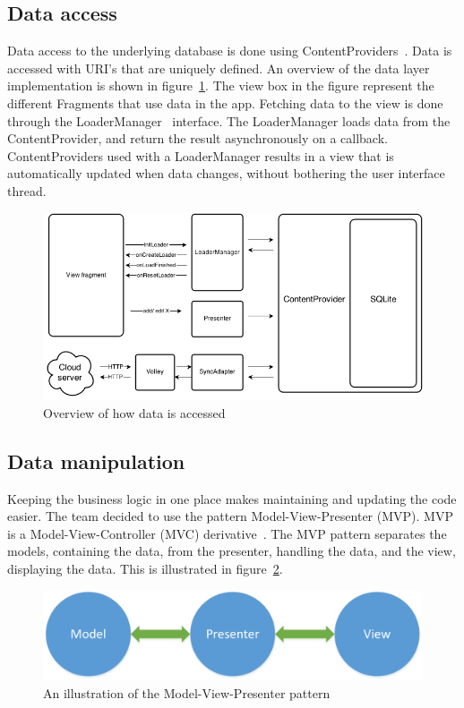 \subsection{Data access}
Data access to the underlying database is done using ContentProviders~\cite{contentproviders}. Data is accessed with \gls{URI}'s that are uniquely defined. An overview of the data layer implementation is shown in figure~\ref{fig:archAppOverview}. The view box in the figure represent the different Fragments that use data in the app. Fetching data to the view is done through the LoaderManager~\cite{loadermanager} interface. The LoaderManager loads data from the ContentProvider, and return the result asynchronously on a callback. ContentProviders used with a LoaderManager results in a view that is automatically updated when data changes, without bothering the user interface thread.

\begin{figure}[H]
\includegraphics[width=\textwidth]{ch/architecture/fig/arch_app_overview.png}
\caption{Overview of how data is accessed}
\label{fig:archAppOverview}
\end{figure}

\newpage
\subsection{Data manipulation}
Keeping the business logic in one place makes maintaining and updating the code easier. The team decided to use the pattern Model-View-Presenter (MVP). MVP is a Model-View-Controller (MVC) derivative~\cite{mvc}. The MVP pattern separates the models, containing the data, from the presenter, handling the data, and the view, displaying the data. This is illustrated in figure~\ref{fig:mvp}. 

\begin{figure}[H]
\includegraphics[width=\textwidth]{ch/architecture/fig/mvp.png}
\caption{An illustration of the Model-View-Presenter pattern}
\label{fig:mvp}
\end{figure}

